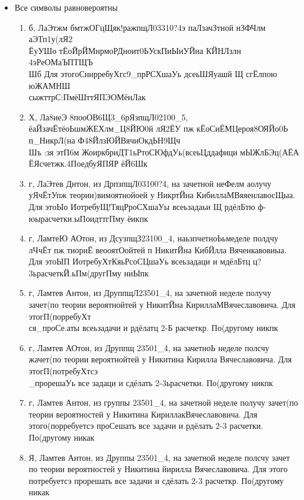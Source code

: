\begin{itemize}
	\item Все символы равновероятны
	
	\begin{enumerate}
		
		\item 
		б, ЛаЭтжм бмтжОГцЩяк!ражпщЛ03310?4э паЛзачЗтной нЗФЧлм аЭТп1у(лЯ2\\ЁуУШо тЁоЙрЙМнрмоРДноит0ЬУскПиЫиУЙна КЙНЛзлн 4эРеОМаЪПТЩЪ\\Шб Для этогоСннрребуХгс9\_прРСХшаУь дсеьШЯуашй Щ сгЁлпою юЖАМНШ\\сыжттрС:ПмёШттЯПЭОМёиЛак
		\item
		Х, Ла8иеЭ 8пооОВ6Щ3\_6рЯзпщЛ02100\_5, ёаЙзачЁтёоЬшмЖЕХлм\_Ц8ЙЮ0й лЯ2ЁУ пж кЁоСиЁМЦероя8ОЯЙо0Ь п\_НикрЛ(на Ф48ЙлзЮЙВячиОкдЬН9Щч\\Шъ :зя этП6м ЖоиркбриДТ1ьРтоСЮфдУь(всеьЦддафици мЫЖлБЭц(АЁА ЁЯсчетжк.4ПоедбуЯПЯР ёЙ6Шк
		\item
		г, ЛаЭтев Днтон, из ДрпзпщЛ03100?4, на зачетной неФелм аолучу уЯчЁтУпж теории)вимоятнойоей у НикртЙна КибиллаМВяяенлавосЩыа. Для этоЫо ИотребуЩ!ТяцРроСХшаУы всеьзадаьи Щ рдёлБтю ф-юырасчетки.ыПоидттгПму ёикпк
		\item
		г, ЛамтеЮ АОтон, из ДсузпщЗ23100\_4, наьзпчетноЬьмеделе полдчу лЧчЁт пж тиориЁ веооятОойтей п НикитЙна КибЙлла Вяченкавовиыа. Для этоЫП ИотребуХтКяьРсоСЦшаУь всеьзадаци и мдёлБтц ц?3ьрасчеткЙ.ьПм(другПму ниЫпк
		\item
		г, Ламтев Антон, из ДруппщЛ23501\_4, на зачетной неделе получу зачет(по теории вероятнойтей у НикитЙна КириллаМВячеславовича. Для этогП(порребуХт\\ся\_проСе.аты всеьзадачи и рдёлатц 2-Б расчеткр. По(другому никпк
		\item
		г, Ламтев АОтон, из Друппщ 23501\_4, на зачетноЬ неделе полсчу жачет(по теории вероятнойтей у Никитина Кирилла Вячеславовича. Для этогП(потребуХтсэ\\\_прорешаУь все задаци и сдёлать 2-3ьрасчетки. По(другому никпк
		\item
		г, Ламтев Антон, из группы 23501\_4, на зачетной неделе получу зачет(по теории вероятностей у Никитина КириллакВячеславовича. Для этого(порребуетсэ проСешать все задачи и рдёлать 2-3 расчетки. По(другому никак
		\item
		Я, Ламтев Антон, из Друппы 23501\_4, на зачетной неделе полсчу зачет по теории вероятностей у Никитина йирилла Вячеславовича. Для этого потребуетсэ прорешать все задачи и сдёлать 2-3 расчеткр. По(другому никак

\end{enumerate}
\end{itemize}
